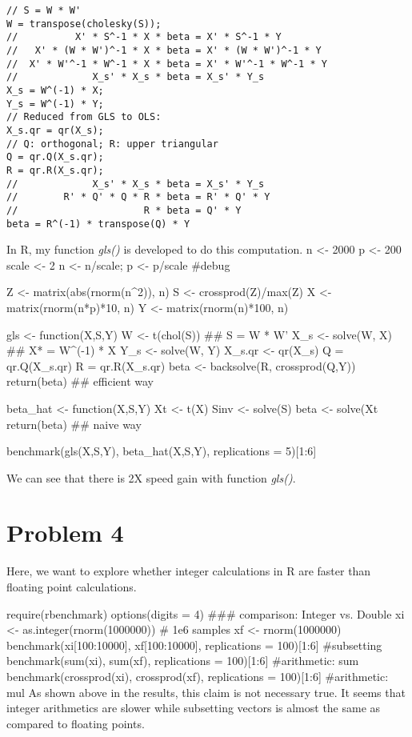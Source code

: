 \documentclass{article}
\begin{document}
\begin{lstlisting}
// S = W * W'
W = transpose(cholesky(S)); 
//          X' * S^-1 * X * beta = X' * S^-1 * Y
//   X' * (W * W')^-1 * X * beta = X' * (W * W')^-1 * Y
//  X' * W'^-1 * W^-1 * X * beta = X' * W'^-1 * W^-1 * Y
//             X_s' * X_s * beta = X_s' * Y_s			
X_s = W^(-1) * X;
Y_s = W^(-1) * Y;
// Reduced from GLS to OLS:
X_s.qr = qr(X_s); 
// Q: orthogonal; R: upper triangular
Q = qr.Q(X_s.qr);  
R = qr.R(X_s.qr); 
//             X_s' * X_s * beta = X_s' * Y_s			
//        R' * Q' * Q * R * beta = R' * Q' * Y
//                      R * beta = Q' * Y
beta = R^(-1) * transpose(Q) * Y
\end{lstlisting}

In R, my function \textit{gls()} is developed to do this computation.
n <- 2000
p <- 200
scale <- 2 
n <- n/scale; p <- p/scale #debug

Z <- matrix(abs(rnorm(n^2)), n)
S <- crossprod(Z)/max(Z)
X <- matrix(rnorm(n*p)*10, n)
Y <- matrix(rnorm(n)*100, n)

gls <- function(X,S,Y){
	W <- t(chol(S)) ## S = W * W'
	X_s <- solve(W, X) ## X* = W^(-1) * X
	Y_s <- solve(W, Y)
	X_s.qr <- qr(X_s)
	Q = qr.Q(X_s.qr)
	R = qr.R(X_s.qr)
	beta <- backsolve(R, crossprod(Q,Y))	
	return(beta) ## efficient way
}

beta_hat <- function(X,S,Y){
	Xt <- t(X)
	Sinv <- solve(S)
	beta <- solve(Xt %
	return(beta) ## naive way
}

benchmark(gls(X,S,Y), beta_hat(X,S,Y), replications = 5)[1:6]


We can see that there is 2X speed gain with function \textit{gls()}.

\newpage
\section*{Problem 4}
Here, we want to explore whether integer calculations in R are faster than
floating point calculations.

require(rbenchmark)
options(digits = 4)
### comparison: Integer vs. Double
xi <- as.integer(rnorm(1000000)) # 1e6 samples
xf <- rnorm(1000000)
benchmark(xi[100:10000], xf[100:10000], replications = 100)[1:6] #subsetting
benchmark(sum(xi), sum(xf), replications = 100)[1:6] #arithmetic: sum
benchmark(crossprod(xi), crossprod(xf), replications = 100)[1:6] #arithmetic: mul
As shown above in the results, this claim is not necessary true. It seems that 
integer arithmetics are slower while subsetting vectors is almost the same as compared to
floating points.
\end{document}
